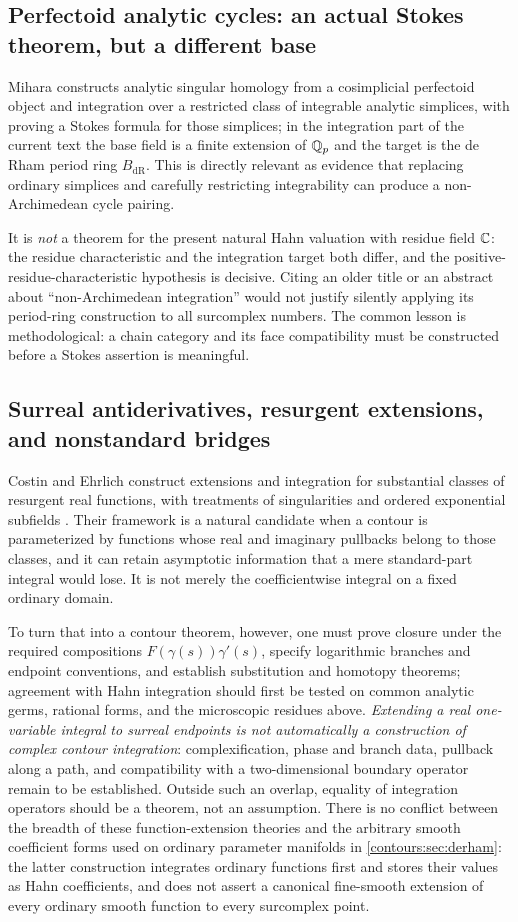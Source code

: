 \documentclass[11pt,letterpaper]{article}
\theoremstyle{definition}
\theoremstyle{remark}
\newcommand{\dR}{\mathrm{dR}}
\numberwithin{equation}{section}
\begin{document}
\subsection{Perfectoid analytic cycles: an actual Stokes theorem, but a different
base}
Mihara constructs analytic singular homology from a cosimplicial perfectoid object
and integration over a restricted class of integrable analytic simplices, with
\cite[Thm.~5.15]{Mihara} proving a Stokes formula for those simplices; in the
integration part of the current text the base field is a finite extension of
$\mathbb Q_p$ and the target is the de Rham period ring $B_\dR$. This is directly relevant
as evidence that replacing ordinary simplices and carefully restricting
integrability can produce a non-Archimedean cycle pairing.

It is \emph{not} a theorem for the present natural Hahn valuation with residue field
$\mathbb C$: the residue characteristic and the integration target both differ, and the
positive-residue-characteristic hypothesis is decisive. Citing an older title or an
abstract about ``non-Archimedean integration'' would not justify silently applying
its period-ring construction to all surcomplex numbers. The common lesson is
methodological: a chain category and its face compatibility must be constructed
before a Stokes assertion is meaningful.

\subsection{Surreal antiderivatives, resurgent extensions, and nonstandard bridges}
Costin and Ehrlich construct extensions and integration for substantial classes of
resurgent real functions, with treatments of singularities and ordered exponential
subfields \cite{CE}. Their framework is a natural candidate when a contour is
parameterized by functions whose real and imaginary pullbacks belong to those
classes, and it can retain asymptotic information that a mere standard-part integral
would lose. It is not merely the coefficientwise integral on a fixed ordinary
domain.

To turn that into a contour theorem, however, one must prove closure under the
required compositions $F(\gamma(s))\gamma'(s)$, specify logarithmic branches and
endpoint conventions, and establish substitution and homotopy theorems; agreement
with Hahn integration should first be tested on common analytic germs, rational
forms, and the microscopic residues above. \emph{Extending a real one-variable
integral to surreal endpoints is not automatically a construction of complex contour
integration}: complexification, phase and branch data, pullback along a path, and
compatibility with a two-dimensional boundary operator remain to be established.
Outside such an overlap, equality of integration operators should be a theorem, not
an assumption. There is no conflict between the breadth of these function-extension
theories and the arbitrary smooth coefficient forms used on ordinary parameter
manifolds in \cref{contours:sec:derham}: the latter construction integrates ordinary
functions first and stores their values as Hahn coefficients, and does not assert a
canonical fine-smooth extension of every ordinary smooth function to every
surcomplex point.
\end{document}
